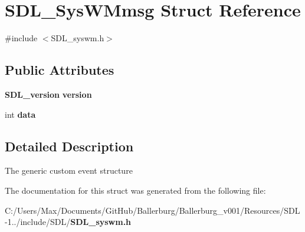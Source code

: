 \section{S\+D\+L\+\_\+\+Sys\+W\+Mmsg Struct Reference}
\label{struct_s_d_l___sys_w_mmsg}


{\ttfamily \#include $<$S\+D\+L\+\_\+syswm.\+h$>$}

\subsection*{Public Attributes}
\begin{DoxyCompactItemize}
\item 
{\bf S\+D\+L\+\_\+version} {\bfseries version}\label{struct_s_d_l___sys_w_mmsg_a95f9aae58d18ee8fac556416b322a5fb}

\item 
int {\bfseries data}\label{struct_s_d_l___sys_w_mmsg_ae2399a5ef24f5a1b39ad053c71ce5a43}

\end{DoxyCompactItemize}


\subsection{Detailed Description}
The generic custom event structure 

The documentation for this struct was generated from the following file\+:\begin{DoxyCompactItemize}
\item 
C\+:/\+Users/\+Max/\+Documents/\+Git\+Hub/\+Ballerburg/\+Ballerburg\+\_\+v001/\+Resources/\+S\+D\+L-\/1../include/\+S\+D\+L/{\bf S\+D\+L\+\_\+syswm.\+h}\end{DoxyCompactItemize}
